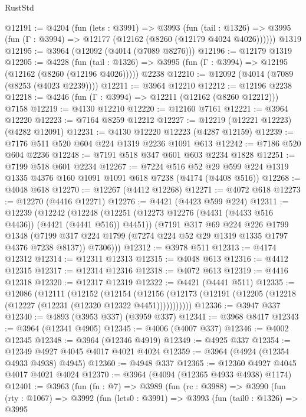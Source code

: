 \begin{lexlean}{RustStd}
\begin{coremodule}
@12191 := @4204
    (fun (lets : @3991) =>
    @3993
      (fun (tail : @1326) =>
      @3995 (fun (Γ : @3994) => @12177 (@12162 (@8260 (@12179 @4024 @4026))))))
    @1319
@12195 := @3964 (@12092 (@4014 (@7089 @8276)))
@12196 := @12179 @1319
@12205 := @4228
    (fun (tail : @1326) => @3995 (fun (Γ : @3994) => @12195 (@12162 (@8260 (@12196 @4026)))))
    @2238
@12210 := @12092 (@4014 (@7089 (@8253 (@4023 @2239))))
@12211 := @3964 @12210
@12212 := @12196 @2238
@12218 := @4246 (fun (Γ : @3994) => @12211 (@12162 (@8260 @12212))) @7158
@12219 := @4130 @12210
@12220 := @12160 @7161
@12221 := @3964 @12220
@12223 := @7164 @8259 @12212
@12227 := @12219 (@12221 @12223) (@4282 @12091)
@12231 := @4130 @12220 @12223 (@4287 @12159)
@12239 := @7176 @511 @520 @604 @224 @1319 @2236 @1091 @613
@12242 := @7186 @520 @604 @2236
@12248 := @7191 @518 @347 @601 @603 @2234 @1828
@12251 := @7199 @518 @601 @2234
@12267 := @7224
    @516
    @52
    @29
    @599
    @224
    @1319
    @1335
    @4376
    @160
    @1091
    @1091
    @618
    @7238
    (@4174 (@4408 @516))
@12268 := @4048 @618
@12270 := @12267 (@4412 @12268)
@12271 := @4072 @618
@12273 := @12270 (@4416 @12271)
@12276 := @4421 (@4423 @599 @224)
@12311 := @12239
    (@12242
      (@12248
        (@12251 (@12273 @12276 (@4431 (@4433 @516 @4436)) (@4421 (@4441 @516)) @4451))
        (@7191
          @317
          @69
          @224
          @226
          @1799
          @1348
          (@7199 @317 @224 @1799 (@7274 @224 @52 @29 @1319 @1335 @1797 @4376 @7238 @8137))
          @7306)))
@12312 := @3978 @511
@12313 := @4174 @12312
@12314 := @12311 @12313
@12315 := @4048 @613
@12316 := @4412 @12315
@12317 := @12314 @12316
@12318 := @4072 @613
@12319 := @4416 @12318
@12320 := @12317 @12319
@12322 := @4421 (@4441 @511)
@12335 := @12086
    (@12111
      (@12152
        (@12154
          (@12156 (@12173 (@12191 (@12205 (@12218 (@12227 (@12231 (@12320 @12322 @4451)))))))))))
@12336 := @3947 @337
@12340 := @4893 (@3953 @337) (@3959 @337)
@12341 := @3968 @8417
@12343 := @3964 (@12341 @4905)
@12345 := @4006 (@4007 @337)
@12346 := @4002 @12345
@12348 := @3964 (@12346 @4919)
@12349 := @4925 @337
@12354 := @12349 @4927 @4045 @4017 @4021 @4024
@12359 := @3964 (@4924 (@12354 @4933 @4938) @4945)
@12360 := @4948 @337
@12365 := @12360 @4927 @4045 @4017 @4021 @4024
@12370 := @3964 (@4094 (@12365 @4933 @4938) @1174)
@12401 := @3963
    (fun (fn : @7) =>
    @3989
      (fun (rc : @3988) =>
      @3990
        (fun (rty : @1067) =>
        @3992
          (fun (lets0 : @3991) =>
          @3993
            (fun (tail0 : @1326) =>
            @3995

\end{coremodule}
\end{lexlean}
